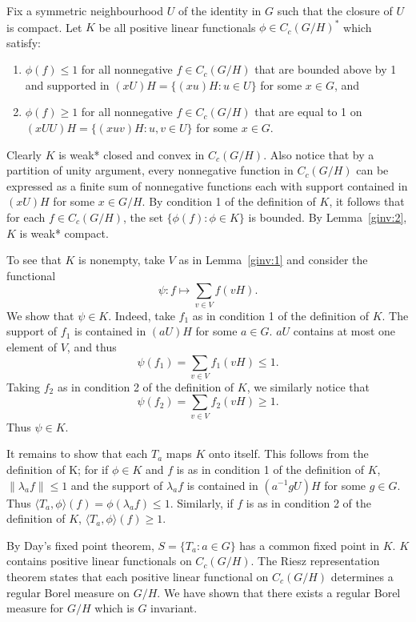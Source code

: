 Fix a symmetric neighbourhood $U$ of the identity in $G$ such that the 
closure of $U$ is compact.  Let $K$ be all positive linear functionals 
$\phi \in C_c(G/H)^*$ which satisfy:
\begin{enumerate}
\item $\phi(f) \leq 1$ for all nonnegative $f \in C_c(G/H)$ that are 
bounded 
above by 1 and supported in $(xU)H = \{(xu)H: u\in U\}$ for some $x \in G$, and
\item $\phi(f) \geq 1$ for all nonnegative $f \in C_c(G/H)$ that are equal 
to 1 on $(xUU)H = \{(xuv)H: u,v\in U\}$ for some $x \in G$.
\end{enumerate}
Clearly $K$ is weak* closed and convex in $C_c(G/H)$.  Also notice that by 
a partition of unity argument, every nonnegative function in $C_c(G/H)$ 
can be expressed as a finite sum of nonnegative functions each with 
support contained in $(xU)H$ for some $x \in G/H$.  By condition 1 of the 
definition of $K$, it follows that for each $f \in C_c(G/H)$, the set 
$\{\phi(f):\phi\in K\}$ is bounded.  By Lemma~\ref{ginv:2}, $K$ 
is weak* compact.

To see that $K$ is nonempty, take $V$ as in Lemma~\ref{ginv:1} and consider
the functional
\[
\psi : f \mapsto \sum_{v\in V} f(vH).
\]
We show that $\psi \in K$.
Indeed, take $f_1$ as in condition 1 of the definition of $K$.  The support of $f_1$
is contained in $(aU)H$ for some $a\in G$.  $aU$ contains at most one element of $V$,
and thus
\[
\psi(f_1) = \sum_{v\in V} f_1(vH) \leq 1.
\]
Taking $f_2$ as in
condition 2 of the definition of $K$, we similarly notice that
\[
\psi(f_2) = \sum_{v\in V} f_2(vH) \geq 1.
\]
Thus $\psi\in K$.

It remains to show that each $T_a$ maps $K$ onto itself.  This follows 
from the definition of K; for if $\phi \in K$ and $f$ is as in condition 1 
of the definition of $K$, $\|\lambda_a f\| \leq 1$ and the support of $\lambda_a f$ is 
contained in $(a^{-1}gU)H$ for some $g \in G$.  Thus $\langle T_a,\phi\rangle(f) = 
\phi(\lambda_a f) \leq 1$.  Similarly, if $f$ is as in condition 2 of the 
definition of $K$, $\langle T_a,\phi\rangle(f) \geq 1$.

By Day's fixed point theorem, $S = \{T_a: a\in G\}$ has a common 
fixed point in $K$.  $K$ contains positive linear functionals on $C_c(G/H)$.
The Riesz representation theorem states that each
positive linear functional on $C_c(G/H)$ determines a regular Borel measure on $G/H$.
We have shown that there exists a regular Borel measure for $G/H$ which
is $G$ invariant.
\done

